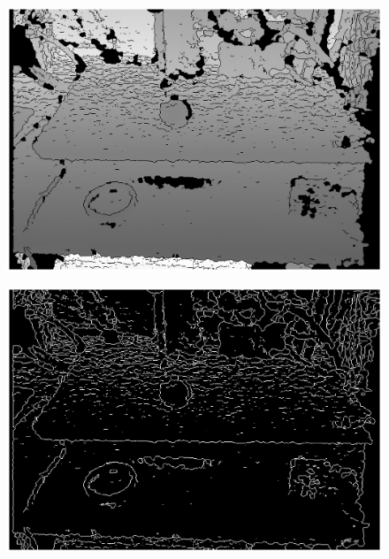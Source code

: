\begin{figure}
	\centering
	\includegraphics[width=1\linewidth]{visio/graficasderesultados/Dbordes1}
	\caption{}
	\label{fig:dbordes1}
\end{figure}
\begin{figure}
	\centering
	\includegraphics[width=1\linewidth]{visio/graficasderesultados/Dsobel1}
	\caption{}
	\label{fig:dsobel1}
\end{figure}

